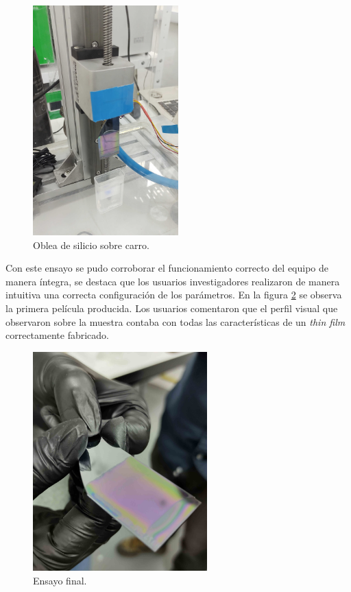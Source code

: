 \begin{figure}[h!]
\centering 
\includegraphics[width=0.5\textwidth]{./Figures/prueba_a.jpg}
\caption{Oblea de silicio sobre carro.}
\label{fig:equipo_laboratorio_a}
\end{figure}

Con este ensayo se pudo corroborar el funcionamiento correcto del equipo de manera íntegra, se destaca que los usuarios investigadores realizaron de manera intuitiva una correcta configuración de los parámetros. En la figura \ref{fig:equipo_laboratorio_c} se observa la primera película producida. Los usuarios comentaron que el perfil visual que observaron sobre la muestra contaba con todas las características de un \textit{thin film} correctamente fabricado.  

\begin{figure}[h!]
\centering 
\includegraphics[width=0.6\textwidth]{./Figures/prueba_c.jpg}
\caption{Ensayo final.}
\label{fig:equipo_laboratorio_c}
\end{figure}

